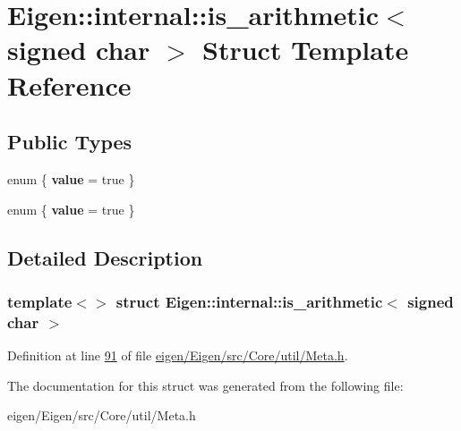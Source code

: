 \hypertarget{struct_eigen_1_1internal_1_1is__arithmetic_3_01signed_01char_01_4}{}\section{Eigen\+:\+:internal\+:\+:is\+\_\+arithmetic$<$ signed char $>$ Struct Template Reference}
\label{struct_eigen_1_1internal_1_1is__arithmetic_3_01signed_01char_01_4}
\subsection*{Public Types}
\begin{DoxyCompactItemize}
\item 
\mbox{\label{struct_eigen_1_1internal_1_1is__arithmetic_3_01signed_01char_01_4_a281c79084edebea9e95acd076b22414e}} 
enum \{ {\bfseries value} = true
 \}
\item 
\mbox{\label{struct_eigen_1_1internal_1_1is__arithmetic_3_01signed_01char_01_4_ab4fc060a7a0cc5295e6468411a94758e}} 
enum \{ {\bfseries value} = true
 \}
\end{DoxyCompactItemize}


\subsection{Detailed Description}
\subsubsection*{template$<$$>$\newline
struct Eigen\+::internal\+::is\+\_\+arithmetic$<$ signed char $>$}



Definition at line \hyperlink{eigen_2_eigen_2src_2_core_2util_2_meta_8h_source_l00091}{91} of file \hyperlink{eigen_2_eigen_2src_2_core_2util_2_meta_8h_source}{eigen/\+Eigen/src/\+Core/util/\+Meta.\+h}.



The documentation for this struct was generated from the following file\+:\begin{DoxyCompactItemize}
\item 
eigen/\+Eigen/src/\+Core/util/\+Meta.\+h\end{DoxyCompactItemize}
